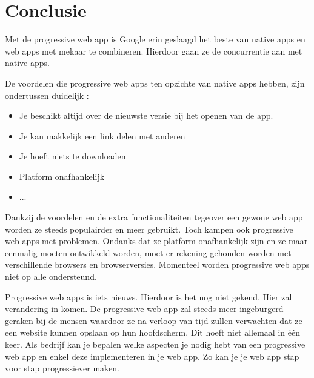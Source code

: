 
\chapter{Conclusie}
\label{ch:conclusie}

 
Met de progressive web app is Google erin geslaagd het beste van native apps en web apps met mekaar te combineren. Hierdoor gaan ze de concurrentie aan met native apps.

De voordelen die progressive web apps ten opzichte van native apps hebben, zijn ondertussen duidelijk :

\begin{itemize}
	\item Je beschikt altijd over de nieuwste versie bij het openen van de app.
	\item Je kan makkelijk een link delen met anderen
	\item Je hoeft niets te downloaden
	\item Platform onafhankelijk
	\item ...
\end{itemize}

 Dankzij de voordelen en de extra functionaliteiten tegeover een gewone web app worden ze steeds populairder en meer gebruikt. Toch kampen ook progressive web apps met problemen. Ondanks dat ze platform onafhankelijk zijn en ze maar eenmalig moeten ontwikkeld worden, moet er rekening gehouden worden met verschillende browsers en browserversies. Momenteel worden progressive web apps niet op alle ondersteund. 

Progressive web apps is iets nieuws. Hierdoor is het nog niet gekend. Hier zal verandering in komen. De progressive web app zal steeds meer ingeburgerd geraken bij de mensen waardoor ze na verloop van tijd zullen verwachten dat ze een website kunnen opslaan op hun hoofdscherm. Dit hoeft niet allemaal in één keer. Als bedrijf kan je bepalen welke aspecten je nodig hebt van een progressive web app en enkel deze implementeren in je web app. Zo kan je je web app stap voor stap progressiever maken. 

